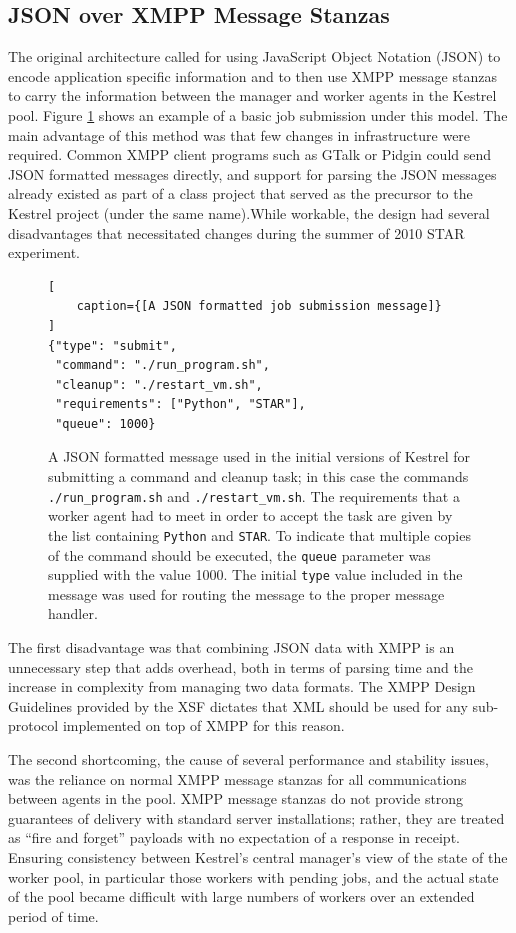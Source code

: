 \subsection{JSON over XMPP Message Stanzas}
The original architecture called for using JavaScript Object Notation (JSON)
\cite{Crockford} to encode application specific information and to then use XMPP
message stanzas to carry the information between the manager and worker agents
in the Kestrel pool. Figure \ref{fig:JSON-message} shows an example of a basic
job submission under this model. The main advantage of this method was that few
changes in infrastructure were required. Common XMPP client programs such as
GTalk or Pidgin could send JSON formatted messages directly, and support for
parsing the JSON messages already existed as part of a class project that served
as the precursor to the Kestrel project (under the same name).While workable,
the design had several disadvantages that necessitated changes during the summer
of 2010 STAR experiment.

\begin{figure}
\begin{lstlisting}[
    caption={[A JSON formatted job submission message]}
]
{"type": "submit",
 "command": "./run_program.sh",
 "cleanup": "./restart_vm.sh",
 "requirements": ["Python", "STAR"],
 "queue": 1000}
\end{lstlisting}
\label{fig:JSON-message}
\caption{A JSON formatted message used in the initial versions of Kestrel for
submitting a command and cleanup task; in this case the commands \texttt{./run\_program.sh}
and \texttt{./restart\_vm.sh}. The requirements that a worker agent had to meet in order
to accept the task are given by the list containing \texttt{Python} and \texttt{STAR}.
To indicate that multiple copies of the command should be executed, the \texttt{queue}
parameter was supplied with the value 1000. The initial \texttt{type} value included
in the message was used for routing the message to the proper message handler.}
\end{figure}

The first disadvantage was that combining JSON data with XMPP is an unnecessary
step that adds overhead, both in terms of parsing time and the increase
in complexity from managing two data formats. The XMPP Design Guidelines \cite{XEP-0134}
provided by the XSF \cite{XSF} dictates that XML should be used for any sub-protocol
implemented on top of XMPP for this reason.

The second shortcoming, the cause of several performance and stability issues, was
the reliance on normal XMPP message stanzas for all communications between agents in
the pool. XMPP message stanzas do not provide strong guarantees of delivery with 
standard server installations; rather, they are treated as ``fire and forget'' payloads
\cite{RFC3921} with no expectation of a response in receipt. Ensuring consistency
between Kestrel's central manager's view of the state of the worker pool, in particular
those workers with pending jobs, and the actual state of the pool became difficult with
large numbers of workers over an extended period of time.


